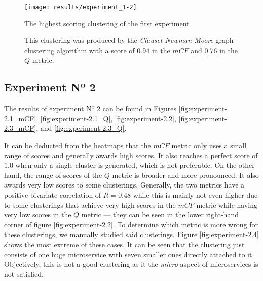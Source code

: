 \documentclass[12pt,a4paper]{report}
\begin{document}
\begin{figure}[htbp]
\centering
\texttt{[image: results/experiment\_1-2]}
\caption{The highest scoring clustering of the first experiment}
\caption*{\centering
  This clustering was produced by the \textit{Clauset-Newman-Moore} graph clustering algorithm with a score of $0.94$ in the $mCF$ and $0.76$ in the $Q$ metric.
}
\label{fig:experiment-1.2}
\end{figure}


\subsection{Experiment Nº 2}

The results of experiment Nº 2 can be found in Figures \ref{fig:experiment-2.1_mCF},
\ref{fig:experiment-2.1_Q}, \ref{fig:experiment-2.2}, \ref{fig:experiment-2.3_mCF},
and \ref{fig:experiment-2.3_Q}.

It can be deducted from the heatmaps that the $mCF$ metric only uses a small
range of scores and generally awards high scores. It also reaches a perfect
score of $1.0$ when only a single cluster is generated, which is not
preferable. On the other hand, the range of scores of the $Q$ metric is broader
and more pronounced. It also awards very low scores to some clusterings.
Generally, the two metrics have a positive bivariate correlation of \(R =
0.48\) while this is mainly not even higher due to some clusterings that
achieve very high scores in the $mCF$ metric while having very low scores in
the $Q$ metric --- they can be seen in the lower right-hand corner of figure
\ref{fig:experiment-2.2}. To determine which metric is more wrong for these
clusterings, we manually studied said clusterings. Figure \ref{fig:experiment-2.4}
shows the most extreme of these cases. It can be seen that the clustering
just consists of one huge microservice with seven smaller ones directly
attached to it. Objectively, this is not a good clustering as it the
\textit{micro}\hyp aspect of microservices is not satisfied.
\end{document}
